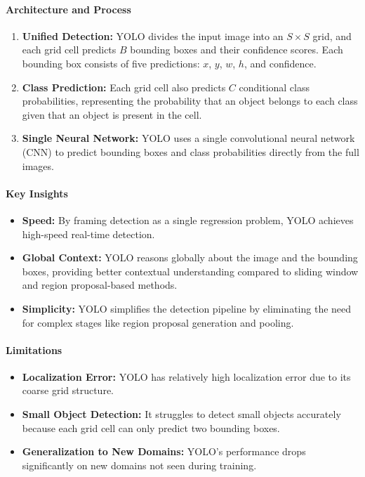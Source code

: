 \documentclass[12pt]{article}
\begin{document}
\paragraph{Architecture and Process}

\begin{enumerate}
    \item \textbf{Unified Detection:} YOLO divides the input image into an \( S \times S \) grid, and each grid cell predicts \( B \) bounding boxes and their confidence scores. Each bounding box consists of five predictions: \( x \), \( y \), \( w \), \( h \), and confidence.
    
    \item \textbf{Class Prediction:} Each grid cell also predicts \( C \) conditional class probabilities, representing the probability that an object belongs to each class given that an object is present in the cell.
    
    \item \textbf{Single Neural Network:} YOLO uses a single convolutional neural network (CNN) to predict bounding boxes and class probabilities directly from the full images.
\end{enumerate}

\paragraph{Key Insights}

\begin{itemize}
    \item \textbf{Speed:} By framing detection as a single regression problem, YOLO achieves high-speed real-time detection.
    
    \item \textbf{Global Context:} YOLO reasons globally about the image and the bounding boxes, providing better contextual understanding compared to sliding window and region proposal-based methods.
    
    \item \textbf{Simplicity:} YOLO simplifies the detection pipeline by eliminating the need for complex stages like region proposal generation and pooling.
\end{itemize}

\paragraph{Limitations}

\begin{itemize}
    \item \textbf{Localization Error:} YOLO has relatively high localization error due to its coarse grid structure.
    
    \item \textbf{Small Object Detection:} It struggles to detect small objects accurately because each grid cell can only predict two bounding boxes.
    
    \item \textbf{Generalization to New Domains:} YOLO's performance drops significantly on new domains not seen during training.
\end{itemize}
\end{document}
